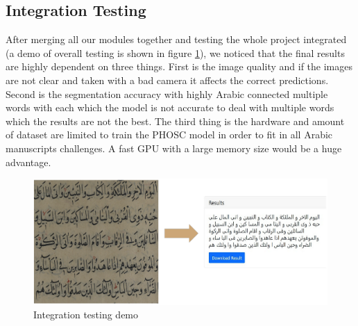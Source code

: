 \subsection{Integration Testing}
After merging all our modules together and testing the whole project integrated (a demo of overall testing is shown in figure \ref{fig:demo}), we noticed that the final results are highly dependent on three things. First is the image quality and if the images are not clear and taken with a bad camera it affects the correct predictions. Second is the segmentation accuracy with highly Arabic connected multiple words with each which the model is not accurate to deal with multiple words which the results are not the best. The third thing is the hardware and amount of dataset are limited to train the PHOSC model in order to fit in all Arabic manuscripts challenges. A fast GPU with a large memory size would be a huge advantage.

\begin{figure}[H]
    \centering
    \includegraphics[width=15cm]{images/demo.png}
    \caption{Integration testing demo}
    \label{fig:demo}
\end{figure}